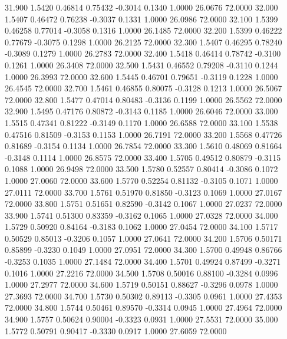   31.900   1.5420   0.46814   0.75432  -0.3014   0.1340   1.0000  26.0676  72.0000
  32.000   1.5407   0.46472   0.76238  -0.3037   0.1331   1.0000  26.0986  72.0000
  32.100   1.5399   0.46258   0.77014  -0.3058   0.1316   1.0000  26.1485  72.0000
  32.200   1.5399   0.46222   0.77679  -0.3075   0.1298   1.0000  26.2125  72.0000
  32.300   1.5407   0.46295   0.78240  -0.3089   0.1279   1.0000  26.2783  72.0000
  32.400   1.5418   0.46414   0.78742  -0.3100   0.1261   1.0000  26.3408  72.0000
  32.500   1.5431   0.46552   0.79208  -0.3110   0.1244   1.0000  26.3993  72.0000
  32.600   1.5445   0.46701   0.79651  -0.3119   0.1228   1.0000  26.4545  72.0000
  32.700   1.5461   0.46855   0.80075  -0.3128   0.1213   1.0000  26.5067  72.0000
  32.800   1.5477   0.47014   0.80483  -0.3136   0.1199   1.0000  26.5562  72.0000
  32.900   1.5495   0.47176   0.80872  -0.3143   0.1185   1.0000  26.6046  72.0000
  33.000   1.5515   0.47341   0.81222  -0.3149   0.1170   1.0000  26.6588  72.0000
  33.100   1.5538   0.47516   0.81509  -0.3153   0.1153   1.0000  26.7191  72.0000
  33.200   1.5568   0.47726   0.81689  -0.3154   0.1134   1.0000  26.7854  72.0000
  33.300   1.5610   0.48069   0.81664  -0.3148   0.1114   1.0000  26.8575  72.0000
  33.400   1.5705   0.49512   0.80879  -0.3115   0.1088   1.0000  26.9498  72.0000
  33.500   1.5780   0.52557   0.80414  -0.3086   0.1072   1.0000  27.0060  72.0000
  33.600   1.5770   0.52254   0.81132  -0.3105   0.1071   1.0000  27.0111  72.0000
  33.700   1.5761   0.51970   0.81850  -0.3123   0.1069   1.0000  27.0167  72.0000
  33.800   1.5751   0.51651   0.82590  -0.3142   0.1067   1.0000  27.0237  72.0000
  33.900   1.5741   0.51300   0.83359  -0.3162   0.1065   1.0000  27.0328  72.0000
  34.000   1.5729   0.50920   0.84164  -0.3183   0.1062   1.0000  27.0454  72.0000
  34.100   1.5717   0.50529   0.85013  -0.3206   0.1057   1.0000  27.0641  72.0000
  34.200   1.5706   0.50171   0.85899  -0.3230   0.1049   1.0000  27.0951  72.0000
  34.300   1.5700   0.49948   0.86766  -0.3253   0.1035   1.0000  27.1484  72.0000
  34.400   1.5701   0.49924   0.87499  -0.3271   0.1016   1.0000  27.2216  72.0000
  34.500   1.5708   0.50016   0.88100  -0.3284   0.0996   1.0000  27.2977  72.0000
  34.600   1.5719   0.50151   0.88627  -0.3296   0.0978   1.0000  27.3693  72.0000
  34.700   1.5730   0.50302   0.89113  -0.3305   0.0961   1.0000  27.4353  72.0000
  34.800   1.5744   0.50461   0.89570  -0.3314   0.0945   1.0000  27.4964  72.0000
  34.900   1.5757   0.50624   0.90004  -0.3323   0.0931   1.0000  27.5531  72.0000
  35.000   1.5772   0.50791   0.90417  -0.3330   0.0917   1.0000  27.6059  72.0000
